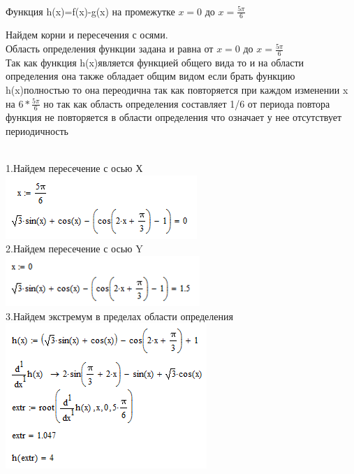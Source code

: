 \documentclass[russian,utf8,nocolumnxxxi,nocolumnxxxii]{eskdtext}
\begin{document}
\newpage
\\Функция h(x)=f(x)-g(x) на промежутке $x=0$ до $x=\frac{5\pi}{6}$ \\

Найдем корни и пересечения с осями.
\\Область определения функции задана и равна от $x=0$ до $x=\frac{5\pi}{6}$
\\Так как функция h(x)является функцией общего вида то и на области определения она также обладает общим видом если брать функцию h(x)полностью то она переодична так как повторяется при каждом изменении x на $6*\frac {5\pi}{6}$ но так как область определения составляет 1/6 от периода повтора функция не повторяется в области определения что означает у нее отсутствует периодичность
\par
\normalsize
\\1.Найдем пересечение с осью Х
\\\includegraphics[scale=0.90]{3}
\\2.Найдем пересечение с осью Y
\\\includegraphics[scale=0.90]{4}
\newpage
\\3.Найдем экстремум в пределах области определения
\\\includegraphics[scale=1]{5}
\end{document}
